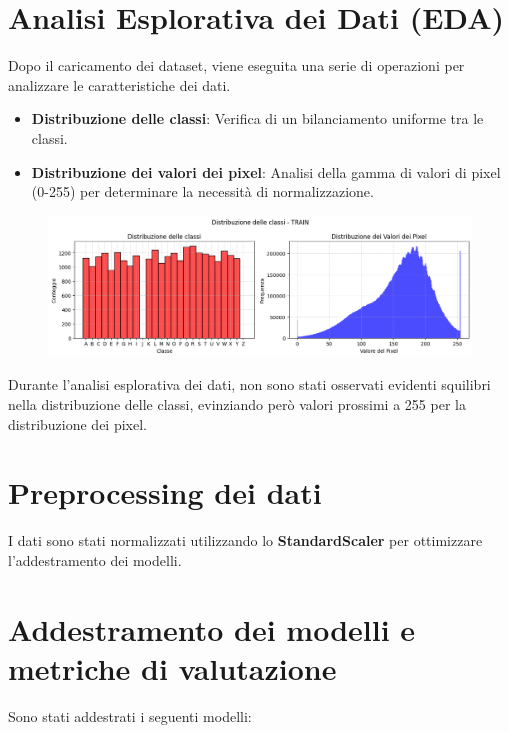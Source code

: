 \documentclass{article}
\begin{document}
\section{Analisi Esplorativa dei Dati (EDA)}

Dopo il caricamento dei dataset, viene eseguita una serie di operazioni per analizzare le caratteristiche dei dati.

\begin{itemize}
    \item \textbf{Distribuzione delle classi}: Verifica di un bilanciamento uniforme tra le classi.
    \item \textbf{Distribuzione dei valori dei pixel}: Analisi della gamma di valori di pixel (0-255) per 
    determinare la necessità di normalizzazione.
\end{itemize}    

\begin{figure}[H]
    \centering
    \includegraphics[scale=0.5]{"Figures/output2.png"}
    \label{fig:dataset}
\end{figure}

Durante l'analisi esplorativa dei dati, non sono stati osservati evidenti squilibri nella distribuzione delle classi, 
evinziando però valori prossimi a 255 per la distribuzione dei pixel.

\section{Preprocessing dei dati}

I dati sono stati normalizzati utilizzando lo \textbf{StandardScaler} per ottimizzare 
l'addestramento dei modelli. 

\section{Addestramento dei modelli e metriche di valutazione}

Sono stati addestrati i seguenti modelli: 
\end{document}
